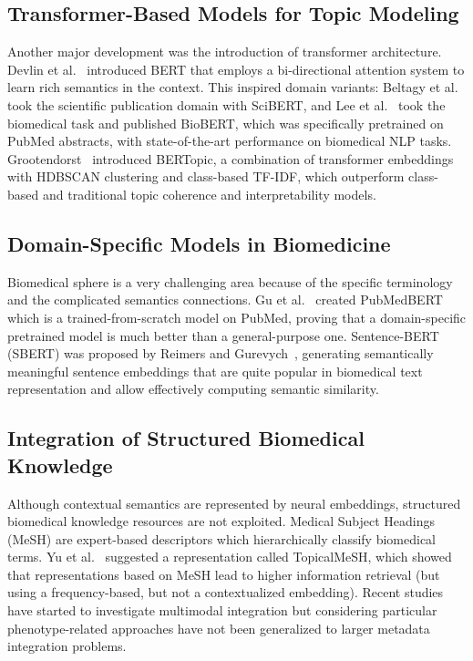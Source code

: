 \documentclass{ieeeaccess}
\begin{document}
\subsection{Transformer-Based Models for Topic Modeling}

Another major development was the introduction of transformer architecture. Devlin et al.~\cite{devlin_bert_2019} introduced BERT that employs a bi-directional attention system to learn rich semantics in the context. This inspired domain variants: Beltagy et al.~\cite{beltagy_scibert_2019} took the scientific publication domain with SciBERT, and Lee et al.~\cite{lee_biobert_2020} took the biomedical task and published BioBERT, which was specifically pretrained on PubMed abstracts, with state-of-the-art performance on biomedical NLP tasks. Grootendorst~\cite{grootendorst_bertopic_2022} introduced BERTopic, a combination of transformer embeddings with HDBSCAN clustering and class-based TF-IDF, which outperform class-based and traditional topic coherence and interpretability models.

\subsection{Domain-Specific Models in Biomedicine}

Biomedical sphere is a very challenging area because of the specific terminology and the complicated semantics connections. Gu et al.~\cite{gu_domain_2022} created PubMedBERT which is a trained-from-scratch model on PubMed, proving that a domain-specific pretrained model is much better than a general-purpose one. Sentence-BERT (SBERT) was proposed by Reimers and Gurevych~\cite{reimers_sentence-bert_2019}, generating semantically meaningful sentence embeddings that are quite popular in biomedical text representation and allow effectively computing semantic similarity.

\subsection{Integration of Structured Biomedical Knowledge}

Although contextual semantics are represented by neural embeddings, structured biomedical knowledge resources are not exploited. Medical Subject Headings (MeSH) are expert-based descriptors which hierarchically classify biomedical terms. Yu et al.~\cite{yu_improving_2016} suggested a representation called TopicalMeSH, which showed that representations based on MeSH lead to higher information retrieval (but using a frequency-based, but not a contextualized embedding). Recent studies have started to investigate multimodal integration but considering particular phenotype-related approaches have not been generalized to larger metadata integration problems.
\end{document}
